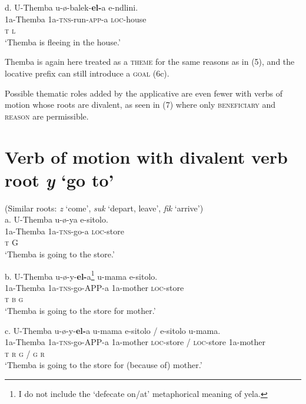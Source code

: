 \gll   d.  U-Themba   u-ø-balek-\textbf{el-}a        e-ndlini. \\
         1a-Themba     1a-\textsc{tns}{}-run-\textsc{app}{}-a  \textsc{loc}{}-house\\
         \textsc{t                  l}\\
\glt     ‘Themba is fleeing in the house.’
\z

Themba is again here treated as a \textsc{theme} for the same reasons as in (5), and the locative prefix can still introduce a \textsc{goal }(6c).

  Possible thematic roles added by the applicative are even fewer with verbs of motion whose roots are divalent, as seen in (7) where only \textsc{beneficiary} and \textsc{reason} are permissible. 

\chapter[Verb of motion with divalent verb root  y ‘go to’ ]{Verb of motion with divalent verb root  \textit{y }‘go to’ }
     (Similar roots: \textit{z} ‘come’, \textit{suk} ‘depart, leave’, \textit{fik} ‘arrive’)\\
\gll   a.  U-Themba    u-ø-ya      e-sitolo. \\
         1a-Themba     1a-\textsc{tns}{}-go-a   \textsc{loc}{}-store\\
         \textsc{t                }G\\
\glt     ‘Themba is going to the store.’
\z

\gll   b.  U-Themba   u-ø-y-\textbf{el-}a\footnote{ I do not include the ‘defecate on/at’ metaphorical meaning of yela.}     u-mama       e-sitolo. \\
         1a-Themba     1a-\textsc{tns}{}-go-APP-a   1a-mother      \textsc{loc}{}-store\\
         \textsc{t                  b           g}\\
\glt     ‘Themba is going to the store for mother.’
\z

\gll   c.  U-Themba  u-ø-y-\textbf{el-}a      u-mama    e-sitolo    / e-sitolo    u-mama.\\
         1a-Themba  1a-\textsc{tns}{}-go-APP-a    1a-mother  \textsc{loc}{}-store  / \textsc{loc}{}-store  1a-mother\\
         \textsc{t              r        g      / g      r}\\
\glt     ‘Themba is going to the store for (because of) mother.’
\z

